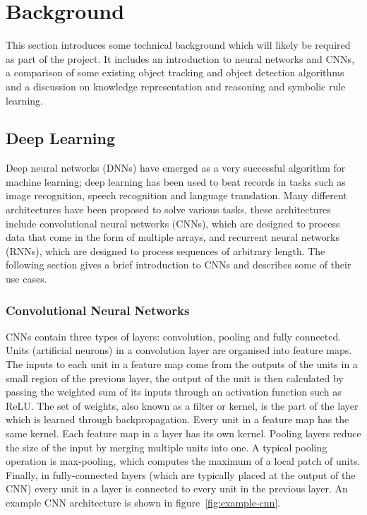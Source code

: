 \documentclass[../interim.tex]{subfiles}
\begin{document}
\section{Background}

This section introduces some technical background which will likely be required as part of the project. It includes an introduction to neural networks and CNNs, a comparison of some existing object tracking and object detection algorithms and a discussion on knowledge representation and reasoning and symbolic rule learning.

\subsection{Deep Learning}

Deep neural networks (DNNs) have emerged as a very successful algorithm for machine learning; deep learning has been used to beat records in tasks such as image recognition, speech recognition and language translation\cite{deep-learning-intro}. Many different architectures have been proposed to solve various tasks, these architectures include convolutional neural networks (CNNs), which are designed to process data that come in the form of multiple arrays\cite{deep-learning-intro}, and recurrent neural networks (RNNs), which are designed to process sequences of arbitrary length\cite{def:rnn}. The following section gives a brief introduction to CNNs and describes some of their use cases.

\subsubsection{Convolutional Neural Networks}

CNNs contain three types of layers: convolution, pooling and fully connected. Units (artificial neurons) in a convolution layer are organised into feature maps. The inputs to each unit in a feature map come from the outputs of the units in a small region of the previous layer, the output of the unit is then calculated by passing the weighted sum of its inputs through an activation function such as ReLU. The set of weights, also known as a filter or kernel, is the part of the layer which is learned through backpropagation. Every unit in a feature map has the same kernel. Each feature map in a layer has its own kernel. Pooling layers reduce the size of the input by merging multiple units into one. A typical pooling operation is max-pooling, which computes the maximum of a local patch of units. Finally, in fully-connected layers (which are typically placed at the output of the CNN) every unit in a layer is connected to every unit in the previous layer. An example CNN architecture is shown in figure~\ref{fig:example-cnn}.
\end{document}
